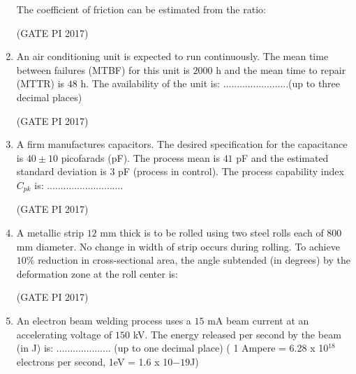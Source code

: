 \documentclass[journal,12pt,onecolumn]{IEEEtran}
\theoremstyle{remark}
\begin{document}
\begin{enumerate}
The coefficient of friction can be estimated from the ratio:

\begin{enumerate}
\end{enumerate}
\hfill (GATE PI 2017)

\item An air conditioning unit is expected to run continuously. The mean time between failures (MTBF) for this unit is $2000$ h and the mean time to repair (MTTR) is $48$ h.  
The availability of the unit is:  
........................(up to three decimal places)  

\hfill (GATE PI 2017)

\item A firm manufactures capacitors. The desired specification for the capacitance is $40 \pm 10$ picofarads (pF).  
The process mean is $41$ pF and the estimated standard deviation is $3$ pF (process in control).  
The process capability index $C_{pk}$ is:  
............................

\hfill (GATE PI 2017)

\item A metallic strip $12$ mm thick is to be rolled using two steel rolls each of $800$ mm diameter.  
No change in width of strip occurs during rolling.  
To achieve $10\%$ reduction in cross\--sectional area, the angle subtended (in degrees) by the deformation zone at the roll center is:
\begin{enumerate}
\end{enumerate}

\hfill (GATE PI 2017)

\item An electron beam welding process uses a $15$ mA beam current at an accelerating voltage of $150$ kV.  
The energy released per second by the beam (in J) is:  
.................... (up to one decimal place) ( 1 Ampere = 6.28 x 10$^{18}$ electrons per second, 1eV = 1.6 x 10$-19$J)  \\


\end{enumerate}
\end{document}
